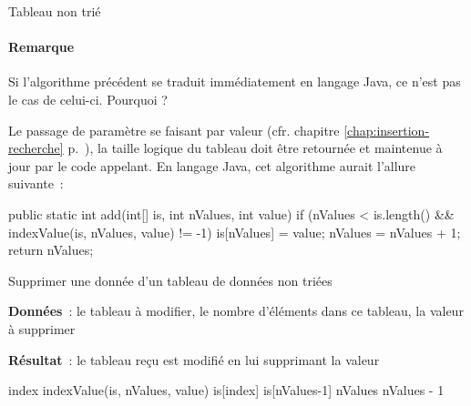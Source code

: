 \begin{Fiche}{Tableau non trié}
		\paragraph{Remarque} Si l'algorithme précédent se traduit immédiatement
		en langage Java, ce n'est pas le cas de celui-ci. Pourquoi ? 
	
		Le passage de paramètre se faisant par valeur (cfr. chapitre
		\ref{chap:insertion-recherche} p.~\pageref{chap:insertion-recherche}),
		la taille logique du tableau doit être retournée et maintenue à jour par
		le code appelant. En langage Java, cet algorithme aurait l'allure
		suivante~:

		\begin{java}
public static int add(int[] is, int nValues, int value){
	if (nValues < is.length() 
			&& indexValue(is, nValues, value) != -1){
		is[nValues] = value;
		nValues = nValues + 1;
	}
	return nValues;
}
		\end{java}


	Supprimer une donnée d'un tableau de données non triées
	
	\textbf{Données}~: le tableau à modifier, le nombre d'éléments dans ce
	tableau, la valeur à supprimer
		
	\textbf{Résultat}~: le tableau reçu est modifié en lui supprimant la valeur
		
		\begin{pseudocode}
				\Let index \Gets indexValue(is, nValues, value)
					\Let is[index] \Gets is[nValues-1]
					\Let nValues \Gets nValues - 1
				\EndIf			
			\EndAlgo
		\end{pseudocode}



	
\end{Fiche}
